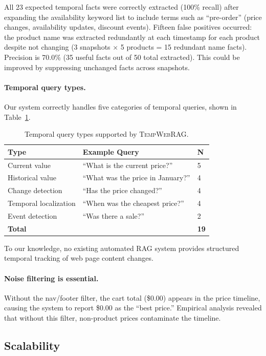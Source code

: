 \documentclass[11pt]{article}
\newcommand{\ours}{\textsc{TempWebRAG}}
\begin{document}
All 23 expected temporal facts were correctly extracted (100\% recall) after expanding the availability keyword list to include terms such as ``pre-order'' (price changes, availability updates, discount events). Fifteen false positives occurred: the product name was extracted redundantly at each timestamp for each product despite not changing (3 snapshots $\times$ 5 products = 15 redundant name facts). Precision is 70.0\% (35 useful facts out of 50 total extracted). This could be improved by suppressing unchanged facts across snapshots.

\paragraph{Temporal query types.} Our system correctly handles five categories of temporal queries, shown in Table~\ref{tab:qtypes}.

\begin{table}[t]
\centering
\caption{Temporal query types supported by \ours{}.}
\label{tab:qtypes}
\small
\begin{tabular}{lll}
\toprule
\textbf{Type} & \textbf{Example Query} & \textbf{N} \\
\midrule
Current value & ``What is the current price?'' & 5 \\
Historical value & ``What was the price in January?'' & 4 \\
Change detection & ``Has the price changed?'' & 4 \\
Temporal localization & ``When was the cheapest price?'' & 4 \\
Event detection & ``Was there a sale?'' & 2 \\
\midrule
\textbf{Total} & & \textbf{19} \\
\bottomrule
\end{tabular}
\end{table} To our knowledge, no existing automated RAG system provides structured temporal tracking of web page content changes.

\paragraph{Noise filtering is essential.} Without the nav/footer filter, the cart total (\$0.00) appears in the price timeline, causing the system to report \$0.00 as the ``best price.'' Empirical analysis revealed that without this filter, non-product prices contaminate the timeline.

\subsection{Scalability}
\end{document}
